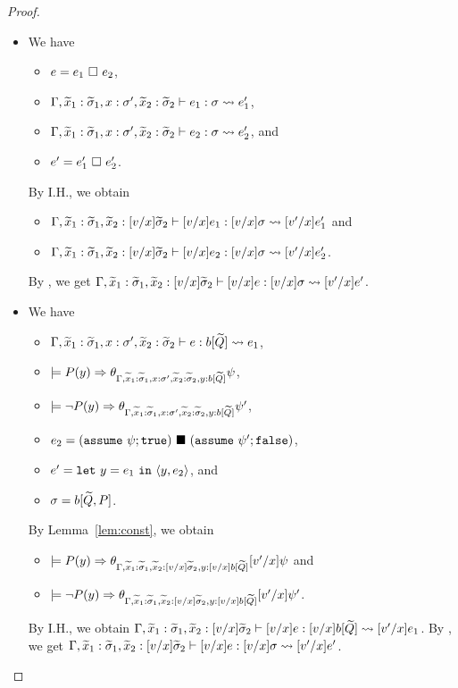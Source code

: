 \begin{proof}
\begin{itemize}
\item[] 
We have
\begin{itemize}
\item \(e=e_1\ \square\ e_2\),
\item \(\Gamma,\widetilde{x}_1:\widetilde{\sigma}_1,x:\sigma',\widetilde{x}_2:\widetilde{\sigma}_2 \vdash e_1 : \sigma \leadsto e_1'\),
\item \(\Gamma,\widetilde{x}_1:\widetilde{\sigma}_1,x:\sigma',\widetilde{x}_2:\widetilde{\sigma}_2 \vdash e_2 : \sigma \leadsto e_2'\), and
\item \(e'=e_1'\ \square\ e_2'\).
\end{itemize}
By I.H., we obtain
\begin{itemize}
\item \(\Gamma,\widetilde{x}_1:\widetilde{\sigma}_1,\widetilde{x}_2:[v/x]\widetilde{\sigma}_2 \vdash [v/x]e_1 : [v/x]\sigma \leadsto [v'/x]e_1'\) and
\item \(\Gamma,\widetilde{x}_1:\widetilde{\sigma}_1,\widetilde{x}_2:[v/x]\widetilde{\sigma}_2 \vdash [v/x]e_2 : [v/x]\sigma \leadsto [v'/x]e_2'\).
\end{itemize}
By , we get
\(\Gamma,\widetilde{x}_1:\widetilde{\sigma}_1,\widetilde{x}_2:[v/x]\widetilde{\sigma}_2 \vdash [v/x]e : [v/x]\sigma \leadsto [v'/x]e'\).

\item[] 
We have
\begin{itemize}
\item \(\Gamma,\widetilde{x}_1:\widetilde{\sigma}_1,x:\sigma',\widetilde{x}_2:\widetilde{\sigma}_2 \vdash e : b[\widetilde{Q}] \leadsto e_1\),
\item \(\models P(y) \Rightarrow \theta_{\Gamma,\widetilde{x}_1:\widetilde{\sigma}_1,x:\sigma',\widetilde{x}_2:\widetilde{\sigma}_2,y:b[\widetilde{Q}]}\psi\),
\item \(\models \neg P(y) \Rightarrow \theta_{\Gamma,\widetilde{x}_1:\widetilde{\sigma}_1,x:\sigma',\widetilde{x}_2:\widetilde{\sigma}_2,y:b[\widetilde{Q}]}\psi'\),
\item \(e_2=(\mathtt{assume~}\psi; \mathtt{true})\ \blacksquare\ (\mathtt{assume~}\psi'; \mathtt{false})\),
\item \(e'=\mathtt{let~}y=e_1\mathtt{~in~}{\langle{y,e_2}\rangle}\), and
\item \(\sigma=b[\widetilde{Q},P]\).
\end{itemize}
By Lemma~\ref{lem:const}, we obtain
\begin{itemize}
\item \(\models P(y) \Rightarrow \theta_{\Gamma,\widetilde{x}_1:\widetilde{\sigma}_1,\widetilde{x}_2:[v/x]\widetilde{\sigma}_2,y:[v/x]b[\widetilde{Q}]}[v'/x]\psi\) and
\item \(\models \neg P(y) \Rightarrow \theta_{\Gamma,\widetilde{x}_1:\widetilde{\sigma}_1,\widetilde{x}_2:[v/x]\widetilde{\sigma}_2,y:[v/x]b[\widetilde{Q}]}[v'/x]\psi'\).
\end{itemize}
By I.H., we obtain
\(\Gamma,\widetilde{x}_1:\widetilde{\sigma}_1,\widetilde{x}_2:[v/x]\widetilde{\sigma}_2 \vdash [v/x]e : [v/x]b[\widetilde{Q}] \leadsto [v'/x]e_1\).
By , we get
\(\Gamma,\widetilde{x}_1:\widetilde{\sigma}_1,\widetilde{x}_2:[v/x]\widetilde{\sigma}_2 \vdash [v/x]e : [v/x]\sigma \leadsto [v'/x]e'\).


\end{itemize}
\end{proof}
